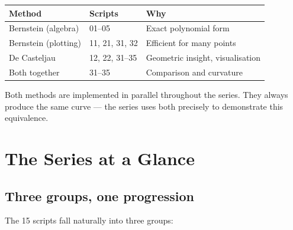 \documentclass[12pt, a4paper]{article}
\begin{document}
\begin{center}
\begin{tabular}{lll}
\toprule
Method & Scripts & Why \\
\midrule
Bernstein (algebra) & 01--05 & Exact polynomial form \\
Bernstein (plotting) & 11, 21, 31, 32 & Efficient for many points \\
De Casteljau & 12, 22, 31--35 & Geometric insight, visualisation \\
Both together & 31--35 & Comparison and curvature \\
\bottomrule
\end{tabular}
\end{center}

Both methods are implemented in parallel throughout the
series.
They always produce the same curve --- the series uses
both precisely to demonstrate this equivalence.


\section{The Series at a Glance}

\subsection{Three groups, one progression}

The 15 scripts fall naturally into three groups:
\end{document}
